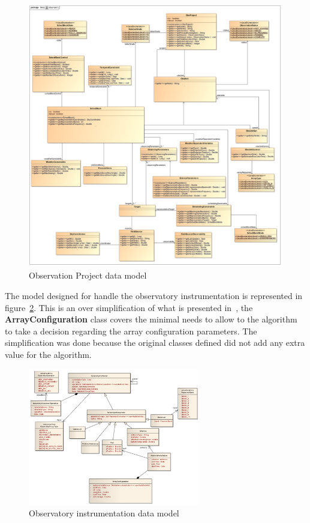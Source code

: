 \begin{figure}[htbp]	
\begin{center}
\includegraphics[width=1.15\textwidth]{images/Obsproject}
\end{center}
\caption{Observation Project data model}
\label{fig:datamodel-obsproject}
\end{figure}

The model designed for handle the observatory instrumentation is represented in figure~\ref{fig:datamodel-observatory}. This is an over simplification of what is presented in~\cite{avarias11, hoffstadt10}, the \textbf{ArrayConfiguration} class covers the minimal needs to allow to the algorithm to take a decision regarding the array configuration parameters. The simplification was done because the original classes defined did not add any extra value for the algorithm.

\begin{figure}[htbp]	
\begin{center}
\includegraphics[width=0.67\textwidth]{images/Observatory}
\end{center}
\caption{Observatory instrumentation data model}
\label{fig:datamodel-observatory}
\end{figure}

